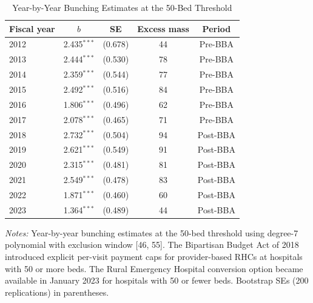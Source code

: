 \begin{table}[t]
\centering
\caption{Year-by-Year Bunching Estimates at the 50-Bed Threshold}
\label{tab:yearly}
\begin{tabular}{lcccc}
\hline\hline
Fiscal year & $\hat{b}$ & SE & Excess mass & Period \\
\hline
2012 & 2.435$^{***}$ & (0.678) & 44 & Pre-BBA \\
2013 & 2.444$^{***}$ & (0.530) & 78 & Pre-BBA \\
2014 & 2.359$^{***}$ & (0.544) & 77 & Pre-BBA \\
2015 & 2.492$^{***}$ & (0.516) & 84 & Pre-BBA \\
2016 & 1.806$^{***}$ & (0.496) & 62 & Pre-BBA \\
2017 & 2.078$^{***}$ & (0.465) & 71 & Pre-BBA \\
2018 & 2.732$^{***}$ & (0.504) & 94 & Post-BBA \\
2019 & 2.621$^{***}$ & (0.549) & 91 & Post-BBA \\
2020 & 2.315$^{***}$ & (0.481) & 81 & Post-BBA \\
2021 & 2.549$^{***}$ & (0.478) & 83 & Post-BBA \\
2022 & 1.871$^{***}$ & (0.460) & 60 & Post-BBA \\
2023 & 1.364$^{***}$ & (0.489) & 44 & Post-BBA \\
\hline\hline
\end{tabular}
\begin{tablenotes}
\item \textit{Notes:} Year-by-year bunching estimates at the 50-bed threshold using degree-7 polynomial with exclusion window [46, 55]. The Bipartisan Budget Act of 2018 introduced explicit per-visit payment caps for provider-based RHCs at hospitals with 50 or more beds. The Rural Emergency Hospital conversion option became available in January 2023 for hospitals with 50 or fewer beds. Bootstrap SEs (200 replications) in parentheses.
\end{tablenotes}
\end{table}

